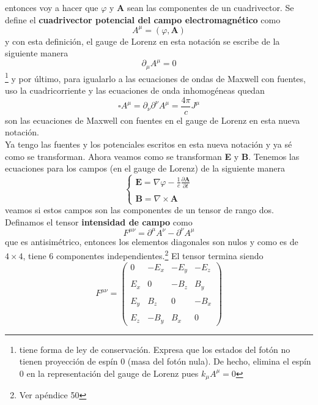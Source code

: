 entonces voy a hacer que $\varphi$ y $\textbf{A}$ sean las componentes de un cuadrivector. Se define el \textbf{cuadrivector potencial del campo electromagnético} como
\begin{equation*}
    A^{\mu} = (\varphi, \textbf{A})
\end{equation*}
y con esta definición, el gauge de Lorenz en esta notación se escribe de la siguiente manera
\begin{equation*}
    \partial_{\mu}A^{\mu} = 0
\end{equation*}\footnote{
tiene forma de ley de conservación. Expresa que los estados del fotón no tienen proyección de espín $0$ (masa del fotón nula). De hecho, elimina el espín $0$ en la representación del gauge de Lorenz pues $k_{\mu}A^{\mu} = 0$}
y por último, para igualarlo a las ecuaciones de ondas de Maxwell con fuentes, uso la cuadricorriente y las ecuaciones de onda inhomogéneas quedan 
\begin{equation*}
    \square A^{\mu} 
    = \partial_{\nu}\partial^{\nu}A^{\mu}
    = \frac{4\pi}{c}J^{\mu}
\end{equation*}
son las ecuaciones de Maxwell con fuentes en el gauge de Lorenz en esta nueva notación.\\
\indent Ya tengo las fuentes y los potenciales escritos en esta nueva notación y ya sé como se transforman. Ahora veamos como se transforman \textbf{E} y \textbf{B}. Tenemos las ecuaciones para los campos (en el gauge de Lorenz) de la siguiente manera
\begin{equation*}
    \left\{
        \begin{matrix}
            \textbf{E} = \nabla \varphi - \frac{1}{c}\frac{\partial \textbf{A}}{\partial t}\\
            \\
            \textbf{B} = \nabla \times \textbf{A}
        \end{matrix}
    \right.
\end{equation*}
veamos si estos campos son las componentes de un tensor de rango dos. Definamos el tensor \textbf{intensidad de campo} como 
\begin{equation*}
    F^{\mu\nu} = \partial^{\mu}A^{\nu} - \partial^{\nu}A^{\mu}
\end{equation*}
que es antisimétrico, entonces los elementos diagonales son nulos y como es de $4 \times 4$, tiene $6$ componentes independientes.\footnote{Ver apéndice 50} El tensor termina siendo
\begin{equation*}
    F^{\mu\nu} 
    = 
    \left(
        \begin{matrix}
            0       & - E_{x} & - E_{y} & - E_{z}\\
            & & & \\
            E_{x}   & 0       & - B_{z} &  B_{y}\\
            & & & \\
            E_{y}   & B_{z}   & 0       & -B_{x}\\
            & & & \\
            E_{z}   & -B_{y}  & B_{x}   &   0
        \end{matrix}
    \right)
\end{equation*}
